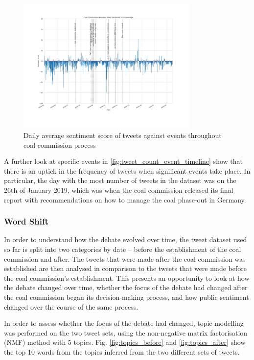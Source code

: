 \documentclass[10pt,twocolumn,twoside]{layout}
\begin{document}
{\begin{figure}[bp] 
	\begin{center}
		\includegraphics[width=0.8\textwidth]{figures/tweet_score_event_timeline}
	\end{center}
	\caption{Daily average sentiment score of tweets against events throughout coal commission process}
	\label{fig:tweet_score_event_timeline}
\end{figure}

A further look at specific events in \ref{fig:tweet_count_event_timeline} show that there is an uptick in the frequency of tweets when significant events take place. In particular, the day with the most number of tweets in the dataset was on the 26th of January 2019, which was when the coal commission released its final report with recommendations on how to manage the coal phase-out in Germany. 

\subsubsection*{Word Shift}
In order to understand how the debate evolved over time, the tweet dataset used so far is split into two categories by date -- before the establishment of the coal commission and after. The tweets that were made after the coal commission was established are then analysed in comparison to the tweets that were made before the coal commission's establishment. This presents an opportunity to look at how the debate changed over time, whether the focus of the debate had changed after the coal commission began its decision-making process, and how public sentiment changed over the course of the same process. 

In order to assess whether the focus of the debate had changed, topic modelling was performed on the two tweet sets, using the non-negative matrix factorisation (NMF) method with 5 topics. Fig. \ref{fig:topics_before} and \ref{fig:topics_after} show the top 10 words from the topics inferred from the two different sets of tweets. 

}
\end{document}
